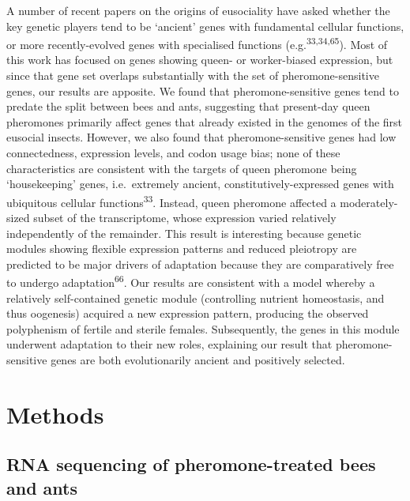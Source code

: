 \documentclass[12pt,]{article}
\begin{document}
A number of recent papers on the origins of eusociality have asked
whether the key genetic players tend to be `ancient' genes with
fundamental cellular functions, or more recently-evolved genes with
specialised functions (e.g.\textsuperscript{33,34,65}). Most of this
work has focused on genes showing queen- or worker-biased expression,
but since that gene set overlaps substantially with the set of
pheromone-sensitive genes, our results are apposite. We found that
pheromone-sensitive genes tend to predate the split between bees and
ants, suggesting that present-day queen pheromones primarily affect
genes that already existed in the genomes of the first eusocial insects.
However, we also found that pheromone-sensitive genes had low
connectedness, expression levels, and codon usage bias; none of these
characteristics are consistent with the targets of queen pheromone being
`housekeeping' genes, i.e.~extremely ancient, constitutively-expressed
genes with ubiquitous cellular functions\textsuperscript{33}. Instead,
queen pheromone affected a moderately-sized subset of the transcriptome,
whose expression varied relatively independently of the remainder. This
result is interesting because genetic modules showing flexible
expression patterns and reduced pleiotropy are predicted to be major
drivers of adaptation because they are comparatively free to undergo
adaptation\textsuperscript{66}. Our results are consistent with a model
whereby a relatively self-contained genetic module (controlling nutrient
homeostasis, and thus oogenesis) acquired a new expression pattern,
producing the observed polyphenism of fertile and sterile females.
Subsequently, the genes in this module underwent adaptation to their new
roles, explaining our result that pheromone-sensitive genes are both
evolutionarily ancient and positively selected.

\section{Methods}\label{methods}

\subsection{RNA sequencing of pheromone-treated bees and
ants}\label{rna-sequencing-of-pheromone-treated-bees-and-ants}
\end{document}
